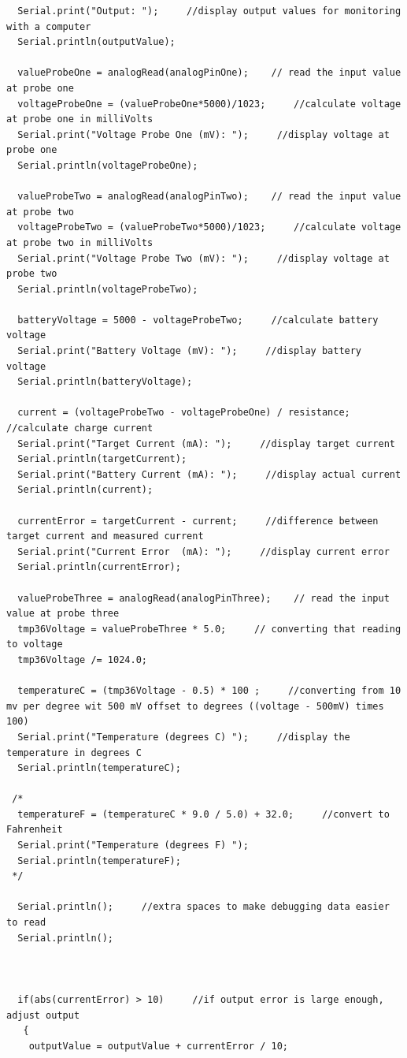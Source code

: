 \documentclass[a4paper, 11pt]{article}           %
\begin{document}
\begin{verbatim}
  Serial.print("Output: ");     //display output values for monitoring with a computer
  Serial.println(outputValue);

  valueProbeOne = analogRead(analogPinOne);    // read the input value at probe one
  voltageProbeOne = (valueProbeOne*5000)/1023;     //calculate voltage at probe one in milliVolts
  Serial.print("Voltage Probe One (mV): ");     //display voltage at probe one
  Serial.println(voltageProbeOne);

  valueProbeTwo = analogRead(analogPinTwo);    // read the input value at probe two
  voltageProbeTwo = (valueProbeTwo*5000)/1023;     //calculate voltage at probe two in milliVolts
  Serial.print("Voltage Probe Two (mV): ");     //display voltage at probe two
  Serial.println(voltageProbeTwo);

  batteryVoltage = 5000 - voltageProbeTwo;     //calculate battery voltage
  Serial.print("Battery Voltage (mV): ");     //display battery voltage
  Serial.println(batteryVoltage);

  current = (voltageProbeTwo - voltageProbeOne) / resistance;     //calculate charge current
  Serial.print("Target Current (mA): ");     //display target current
  Serial.println(targetCurrent);
  Serial.print("Battery Current (mA): ");     //display actual current
  Serial.println(current);

  currentError = targetCurrent - current;     //difference between target current and measured current
  Serial.print("Current Error  (mA): ");     //display current error
  Serial.println(currentError);

  valueProbeThree = analogRead(analogPinThree);    // read the input value at probe three
  tmp36Voltage = valueProbeThree * 5.0;     // converting that reading to voltage
  tmp36Voltage /= 1024.0;

  temperatureC = (tmp36Voltage - 0.5) * 100 ;     //converting from 10 mv per degree wit 500 mV offset to degrees ((voltage - 500mV) times 100)
  Serial.print("Temperature (degrees C) ");     //display the temperature in degrees C
  Serial.println(temperatureC);

 /*
  temperatureF = (temperatureC * 9.0 / 5.0) + 32.0;     //convert to Fahrenheit
  Serial.print("Temperature (degrees F) ");
  Serial.println(temperatureF);
 */

  Serial.println();     //extra spaces to make debugging data easier to read
  Serial.println();



  if(abs(currentError) > 10)     //if output error is large enough, adjust output
   {
    outputValue = outputValue + currentError / 10;


\end{verbatim}
\end{document}
